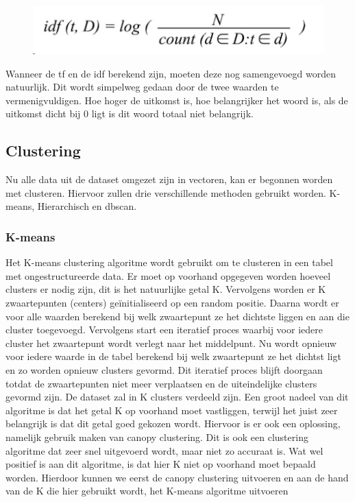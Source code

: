 \begin{figure}[h]
    \centering
    \caption{}
    \label{fig:idf-formule}
    \includegraphics[width=0.7\linewidth]{../foto's/idf-formule}
\end{figure}

Wanneer de tf en de idf berekend zijn, moeten deze nog samengevoegd worden natuurlijk. Dit wordt simpelweg gedaan door de twee waarden te vermenigvuldigen. Hoe hoger de uitkomst is, hoe belangrijker het woord is, als de uitkomst dicht bij 0 ligt is dit woord totaal niet belangrijk.


\subsection{Clustering}
Nu alle data uit de dataset omgezet zijn in vectoren, kan er begonnen worden met clusteren. Hiervoor zullen drie verschillende methoden gebruikt worden. K-means, Hierarchisch en dbscan.

\subsubsection{K-means}
Het K-means clustering algoritme wordt gebruikt om te clusteren in een tabel met ongestructureerde data. Er moet op voorhand opgegeven worden hoeveel clusters er nodig zijn, dit is het natuurlijke getal K. Vervolgens worden er K zwaartepunten (centers) geïnitialiseerd op een random positie. Daarna wordt er voor alle waarden berekend bij welk zwaartepunt ze het dichtste liggen en aan die cluster toegevoegd. Vervolgens start een iteratief proces waarbij voor iedere cluster het zwaartepunt wordt verlegt naar het middelpunt. Nu wordt opnieuw voor iedere waarde in de tabel berekend bij welk zwaartepunt ze het dichtst ligt en zo worden opnieuw clusters gevormd. Dit iteratief proces blijft doorgaan totdat de zwaartepunten niet meer verplaatsen en de uiteindelijke clusters gevormd zijn. De dataset zal in K clusters verdeeld zijn. Een groot nadeel van dit algoritme is dat het getal K op voorhand moet vastliggen, terwijl het juist zeer belangrijk is dat dit getal goed gekozen wordt. Hiervoor is er ook een oplossing, namelijk gebruik maken van canopy clustering. Dit is ook een clustering algoritme dat zeer snel uitgevoerd wordt, maar niet zo accuraat is. Wat wel positief is aan dit algoritme, is dat hier K niet op voorhand moet bepaald worden. Hierdoor kunnen we eerst de canopy clustering uitvoeren en aan de hand van de K die hier gebruikt wordt, het K-means algoritme uitvoeren %


